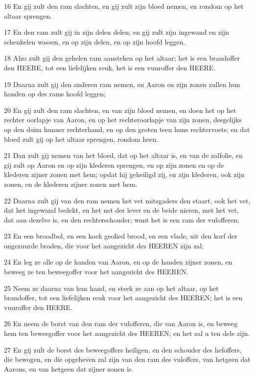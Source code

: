\par 16 En gij zult den ram slachten, en gij zult zijn bloed nemen, en rondom op het altaar sprengen.
\par 17 En den ram zult gij in zijn delen delen; en gij zult zijn ingewand en zijn schenkelen wassen, en op zijn delen, en op zijn hoofd leggen.
\par 18 Alzo zult gij den gehelen ram aansteken op het altaar; het is een brandoffer den HEERE, tot een liefelijken reuk, het is een vuuroffer den HEERE.
\par 19 Daarna zult gij den anderen ram nemen, en Aaron en zijn zonen zullen hun handen op des rams hoofd leggen;
\par 20 En gij zult den ram slachten, en van zijn bloed nemen, en doen het op het rechter oorlapje van Aaron, en op het rechteroorlapje van zijn zonen, desgelijks op den duim hunner rechterhand, en op den groten teen huns rechtervoets; en dat bloed zult gij op het altaar sprengen, rondom heen.
\par 21 Dan zult gij nemen van het bloed, dat op het altaar is, en van de zalfolie, en gij zult op Aaron en op zijn klederen sprengen, en op zijn zonen en op de klederen zijner zonen met hem; opdat hij geheiligd zij, en zijn klederen, ook zijn zonen, en de klederen zijner zonen met hem.
\par 22 Daarna zult gij van den ram nemen het vet mitsgaders den staart, ook het vet, dat het ingewand bedekt, en het net der lever en de beide nieren, met het vet, dat aan dezelve is, en den rechterschouder; want het is een ram der vulofferen;
\par 23 En een broodbol, en een koek geolied brood, en een vlade, uit den korf der ongezuurde broden, die voor het aangezicht des HEEREN zijn zal;
\par 24 En leg ze alle op de handen van Aaron, en op de handen zijner zonen, en beweeg ze ten beweegoffer voor het aangezicht des HEEREN.
\par 25 Neem ze daarna van hun hand, en steek ze aan op het altaar, op het brandoffer, tot een liefelijken reuk voor het aangezicht des HEEREN; het is een vuuroffer den HEERE.
\par 26 En neem de borst van den ram der vulofferen, die van Aaron is, en beweeg hem ten beweegoffer voor het aangezicht des HEEREN; en het zal u ten dele zijn.
\par 27 En gij zult de borst des beweegoffers heiligen, en den schouder des hefoffers, die bewogen, en die opgeheven zal zijn van den ram des vuloffers, van hetgeen dat Aarons, en van hetgeen dat zijner zonen is.
